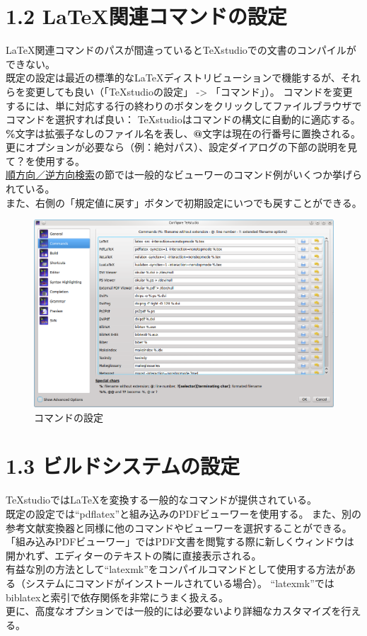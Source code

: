 \documentclass[]{book}
\makeatletter
\def\maxwidth{\ifdim\Gin@nat@width>\linewidth\linewidth
\else\Gin@nat@width\fi}
\let\Oldincludegraphics\includegraphics
\renewcommand{\includegraphics}[1]{\Oldincludegraphics[width=\maxwidth]{#1}}
\makeatother
\begin{document}
\section{1.2 LaTeX関連コマンドの設定}

LaTeX関連コマンドのパスが間違っているとTeXstudioでの文書のコンパイルができない。\\
既定の設定は最近の標準的なLaTeXディストリビューションで機能するが、それらを変更しても良い（「TeXstudioの設定」
-\textgreater{} 「コマンド」）。
コマンドを変更するには、単に対応する行の終わりのボタンをクリックしてファイルブラウザでコマンドを選択すれば良い：
TeXstudioはコマンドの構文に自動的に適応する。\\
\textbf{\%}文字は拡張子なしのファイル名を表し、\textbf{@}文字は現在の行番号に置換される。
更にオプションが必要なら（例：絶対パス）、設定ダイアログの下部の説明を見て？を使用する。\\
\hyperref[SECTION37]{順方向／逆方向検索}の節では一般的なビューワーのコマンド例がいくつか挙げられている。\\
また、右側の「規定値に戻す」ボタンで初期設定にいつでも戻すことができる。

\begin{figure}[htbp]
\centering
\includegraphics{configure_commands.png}
\caption{コマンドの設定}
\end{figure}

\section{1.3 ビルドシステムの設定}

TeXstudioではLaTeXを変換する一般的なコマンドが提供されている。\\
既定の設定では``pdflatex''と組み込みのPDFビューワーを使用する。
また、別の参考文献変換器と同様に他のコマンドやビューワーを選択することができる。\\
「組み込みPDFビューワー」ではPDF文書を閲覧する際に新しくウィンドウは開かれず、エディターのテキストの隣に直接表示される。\\
有益な別の方法として``latexmk''をコンパイルコマンドとして使用する方法がある（システムにコマンドがインストールされている場合）。
``latexmk''ではbiblatexと索引で依存関係を非常にうまく扱える。\\
更に、高度なオプションでは一般的には必要ないより詳細なカスタマイズを行える。\\
\end{document}
